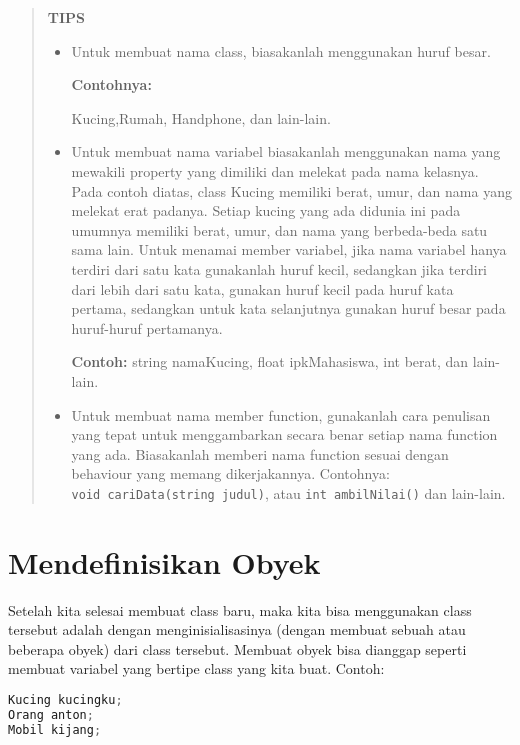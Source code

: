 \begin{quotation}
{\LARGE {}} 		\textbf{TIPS}

\begin{itemize}
\item Untuk membuat
nama class, biasakanlah menggunakan huruf besar.
				
\textbf{ Contohnya:}
				
 Kucing,Rumah, Handphone, dan lain-lain.
				
\item Untuk membuat nama
variabel biasakanlah menggunakan nama yang mewakili property yang
dimiliki dan melekat pada nama kelasnya. Pada contoh diatas, class
Kucing memiliki berat, umur, dan nama yang melekat erat padanya. Setiap
kucing yang ada didunia ini pada umumnya memiliki berat, umur, dan nama
yang berbeda-beda satu sama lain. Untuk menamai member variabel, jika
nama variabel hanya terdiri dari satu kata gunakanlah huruf kecil,
sedangkan jika terdiri dari lebih dari satu kata, gunakan huruf kecil
pada huruf kata pertama, sedangkan untuk kata selanjutnya gunakan huruf
besar pada huruf-huruf pertamanya.
				
 \textbf{Contoh: }string namaKucing, float
ipkMahasiswa, int berat, dan lain-lain.
				
\item Untuk membuat
nama member function, gunakanlah cara penulisan yang tepat untuk
menggambarkan secara benar setiap nama function yang ada. Biasakanlah
memberi nama function sesuai dengan behaviour yang memang dikerjakannya.
Contohnya: \texttt{void\ cariData(string\ judul)}, atau
				\texttt{int\ ambilNilai()} dan lain-lain.
			\end{itemize}
			
	\end{quotation}


\section{Mendefinisikan Obyek}\label{mendefinisikan-obyek}

Setelah kita selesai membuat class baru, maka kita bisa menggunakan
class tersebut adalah dengan menginisialisasinya (dengan membuat sebuah
atau beberapa obyek) dari class tersebut. Membuat obyek bisa dianggap
seperti membuat variabel yang bertipe class yang kita buat. Contoh:

\begin{lstlisting}[language=c++, numbers=none]
Kucing kucingku;
Orang anton;
Mobil kijang;
\end{lstlisting}

